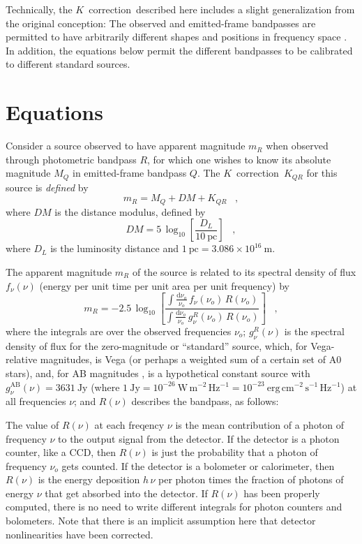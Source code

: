 \documentclass[preprint]{aastex}
\newcommand{\kcorrection}{$K$~correction}
\newcommand{\nuobs}{\nu_o}
\newcommand{\latin}[1]{\textsl{#1}}
\providecommand{\eg}{\latin{e.g.}}
\begin{document}
Technically, the \kcorrection\ described here includes a slight
generalization from the original conception: The observed and
emitted-frame bandpasses are permitted to have arbitrarily different
shapes and positions in frequency space \citep[as they are in,
\eg,][]{kim96a}.  In addition, the equations below permit the different
bandpasses to be calibrated to different standard sources.

\section{Equations}

Consider a source observed to have apparent magnitude $m_R$ when
observed through photometric bandpass $R$, for which one wishes to
know its absolute magnitude $M_Q$ in emitted-frame bandpass $Q$.  The
\kcorrection\ $K_{QR}$ for this source is \emph{defined} by
\begin{equation}
\label{eq:definition}
m_R = M_Q + DM + K_{QR} \;\;\;,
\end{equation}
where $DM$ is the distance modulus, defined by
\begin{equation}
DM = 5\,\log_{10}\left[\frac{D_L}{10~\mathrm{pc}}\right] \;\;\;,
\end{equation}
where $D_L$ is the luminosity distance \citep[\eg,][]{hogg99cosm} and
$1~\mathrm{pc}= 3.086\times 10^{16}~\mathrm{m}$.

The apparent magnitude $m_R$ of the source is related to its spectral
density of flux $f_{\nu}(\nu)$ (energy per unit time per unit area per
unit frequency) by
\begin{equation}
m_R = -2.5\,\log_{10}\left[
  \frac{\displaystyle
          \int\frac{\mathrm{d}\nuobs}{\nuobs}\,f_{\nu}(\nuobs)\,R(\nuobs)}
       {\displaystyle
          \int\frac{\mathrm{d}\nuobs}{\nuobs}\,g^R_{\nu}(\nuobs)\,R(\nuobs)}
\right] \;\;\;,
\end{equation}
where the integrals are over the observed frequencies $\nuobs$;
$g^{R}_{\nu}(\nu)$ is the spectral density of flux for the
zero-magnitude or ``standard'' source, which, for Vega-relative
magnitudes, is Vega (or perhaps a weighted sum of a certain set of A0
stars), and, for AB magnitudes \citep{oke83a}, is a hypothetical
constant source with $g^\mathrm{AB}_{\nu}(\nu)=3631~\mathrm{Jy}$
(where $1~\mathrm{Jy}= 10^{-26}~\mathrm{W\,m^{-2}\,Hz^{-1}}=
10^{-23}~\mathrm{erg\,cm^{-2}\,s^{-1}\,Hz^{-1}}$) at all frequencies
$\nu$; and $R(\nu)$ describes the bandpass, as follows:

The value of $R(\nu)$ at each freqency $\nu$ is the mean contribution
of a photon of frequency $\nu$ to the output signal from the detector.
If the detector is a photon counter, like a CCD, then $R(\nu)$ is just
the probability that a photon of frequency $\nuobs$ gets counted.  If
the detector is a bolometer or calorimeter, then $R(\nu)$ is the
energy deposition $h\,\nu$ per photon times the fraction of photons of
energy $\nu$ that get absorbed into the detector.  If $R(\nu)$ has
been properly computed, there is no need to write different integrals
for photon counters and bolometers.  Note that there is an implicit
assumption here that detector nonlinearities have been corrected.
\end{document}
